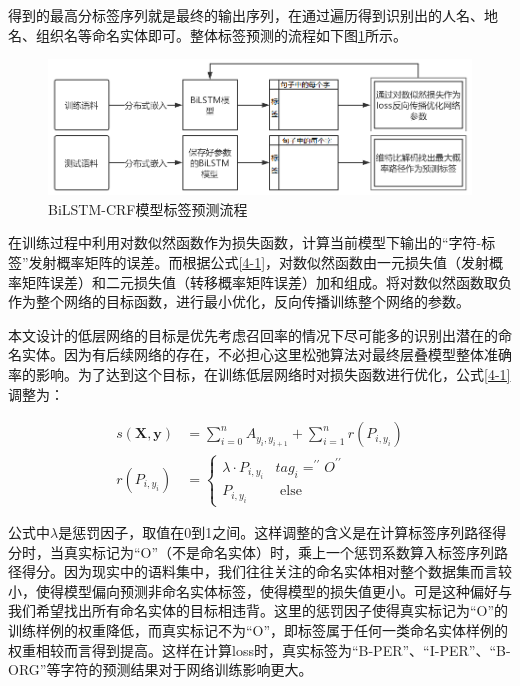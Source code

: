 \documentclass[winfonts,master,oneside,nobackinfo]{njuthesis}
\begin{document}
得到的最高分标签序列就是最终的输出序列，在通过遍历得到识别出的人名、地名、组织名等命名实体即可。整体标签预测的流程如下图\ref{predict}所示。
\begin{figure}[H]
\centering
\includegraphics[width=1\textwidth]{./figure/标签预测流程.jpg}
\caption{BiLSTM-CRF模型标签预测流程}
\label{predict}
\end{figure}

在训练过程中利用对数似然函数作为损失函数，计算当前模型下输出的“字符-标签”发射概率矩阵的误差。而根据公式\ref{4-1}，对数似然函数由一元损失值（发射概率矩阵误差）和二元损失值（转移概率矩阵误差）加和组成。将对数似然函数取负作为整个网络的目标函数，进行最小优化，反向传播训练整个网络的参数。

本文设计的低层网络的目标是优先考虑召回率的情况下尽可能多的识别出潜在的命名实体。因为有后续网络的存在，不必担心这里松弛算法对最终层叠模型整体准确率的影响。为了达到这个目标，在训练低层网络时对损失函数进行优化，公式\ref{4-1}调整为：

\begin{equation} 
\begin{split}
s(\bm{X}, \bm{y})&=\sum_{i=0}^{n} A_{y_{i}, y_{i+1}}+\sum_{i=1}^{n} r(P_{i, y_{i}}) \\ 
r\left(P_{i, y_{i}}\right)&=\left\{\begin{array}{ll}{\lambda \cdot P_{i, y_{i}}} & {t a g_{i}=^{\prime \prime} O^{\prime \prime}} \\ {P_{i, y_{i}}} & {\text { else }}\end{array}\right.
\end{split}
\end{equation}

公式中$\lambda$是惩罚因子，取值在0到1之间。这样调整的含义是在计算标签序列路径得分时，当真实标记为“O”（不是命名实体）时，乘上一个惩罚系数算入标签序列路径得分。因为现实中的语料集中，我们往往关注的命名实体相对整个数据集而言较小，使得模型偏向预测非命名实体标签，使得模型的损失值更小。可是这种偏好与我们希望找出所有命名实体的目标相违背。这里的惩罚因子使得真实标记为“O”的训练样例的权重降低，而真实标记不为“O”，即标签属于任何一类命名实体样例的权重相较而言得到提高。这样在计算loss时，真实标签为“B-PER”、“I-PER”、“B-ORG”等字符的预测结果对于网络训练影响更大。
\end{document}
